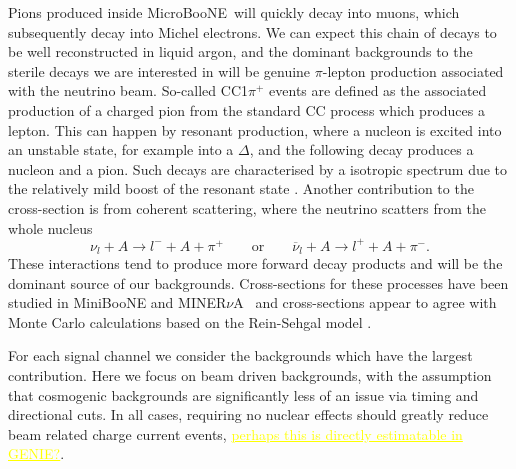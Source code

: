 \documentclass[11pt, a4paper]{article}
\def\muboone{MicroBooNE}
\def\minerva{MINER$\nu$A}
\newcommand{\newtext}[2]{\textcolor{#1}{\ul{#2}}}
\begin{document}
Pions produced inside \muboone\ will quickly decay into muons, which
subsequently decay into Michel electrons. We can expect this chain of decays to
be well reconstructed in liquid argon, and the dominant backgrounds to the
sterile decays we are interested in will be genuine $\pi$-lepton production
associated with the neutrino beam. So-called CC1$\pi^+$ events are defined as
the associated production of a charged pion from the standard CC process which
produces a lepton. This can happen by resonant production, where a nucleon is
excited into an unstable state, for example into a $\Delta$, and the following
decay produces a nucleon and a pion. Such decays are characterised by a
isotropic spectrum due to the relatively mild boost of the resonant state
\cite{Rein:1982pf}. Another contribution to the cross-section is from coherent
scattering, where the neutrino scatters from the whole nucleus 
%
\[   \nu_l + A \to l^- + A + \pi^+ \qquad\text{or}\qquad \overline{\nu}_l + A
\to l^+ + A + \pi^-. \]
%
These interactions tend to produce more forward decay products and will be the
dominant source of our backgrounds. Cross-sections for these processes have
been studied in MiniBooNE \cite{Wascko:2006tx} and \minerva\ \cite{Eberly:2014mra} and cross-sections appear to agree with Monte Carlo
calculations based on the Rein-Sehgal model \cite{Rein:2006di, Rein:1982pf}. 

For each signal channel we consider the backgrounds which have the largest contribution. Here we focus on beam driven backgrounds, with the assumption that cosmogenic backgrounds are significantly less of an issue via timing and directional cuts. In all cases, requiring no nuclear effects should greatly reduce beam related charge current events, \newtext{MARK}{perhaps this is directly estimatable in GENIE?}.
\end{document}

